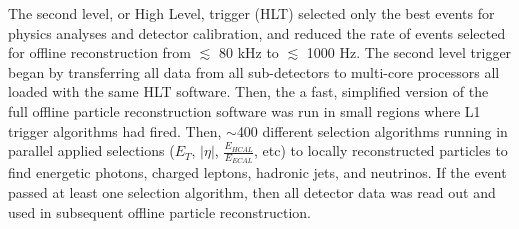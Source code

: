 The second level, or High Level, trigger (HLT) selected only the best events for physics analyses and 
detector calibration, and reduced the rate of events selected for offline reconstruction from 
$\lesssim$ 80 kHz to $\lesssim$ 1000 Hz.  The second level trigger began by transferring all data from all 
sub-detectors to multi-core processors all loaded with the same HLT software.  
Then, the a fast, simplified version of the full offline particle reconstruction software was run in small 
regions where L1 trigger algorithms had fired.  Then, $\sim$400 different selection algorithms running in 
parallel applied selections ($E_{T}$, $|\eta|$, $\frac{E_{HCAL}}{E_{ECAL}}$, etc) to locally reconstructed particles 
to find energetic photons, charged leptons, hadronic jets, and neutrinos.  If the event passed at least one 
selection algorithm, then all detector data was read out and used in subsequent offline particle reconstruction.

